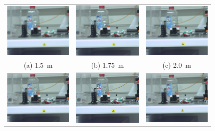 \documentclass[
a4paper,     %
11pt         %
]{scrartcl}  %
\begin{document}
\begin{figure}
\centering
\begin{tabular}{ccc}
 \includegraphics[width=48mm]{./Bildg_Messtechnik_Lab/Autofokus/images/image_01_5.png} & \includegraphics[width=48mm]{./Bildg_Messtechnik_Lab/Autofokus/images/image_01_75.png} & \includegraphics[width=48mm]{./Bildg_Messtechnik_Lab/Autofokus/images/image_02_0.png}\\
(a) \SI{1.5}{m} & (b) \SI{1.75}{m} & (c) \SI{2.0}{m}\\[6pt]
 \includegraphics[width=48mm]{./Bildg_Messtechnik_Lab/Autofokus/images/image_02_5.png} & \includegraphics[width=48mm]{./Bildg_Messtechnik_Lab/Autofokus/images/image_03.png} & \includegraphics[width=48mm]{./Bildg_Messtechnik_Lab/Autofokus/images/image_04.png}\\

\end{tabular}
\end{figure}
\end{document}
